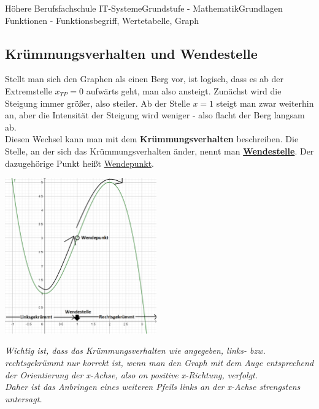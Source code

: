 \documentclass[11pt,twocolumn,oneside,openany,headings=optiontotoc,11pt,numbers=noenddot]{article}
\begin{document}
\begin{worksheet}{Höhere Berufsfachschule IT-Systeme}{Grundstufe - Mathematik}{Grundlagen Funktionen - Funktionsbegriff, Wertetabelle, Graph}
		\subsection*{Krümmungsverhalten und Wendestelle}
		Stellt man sich den Graphen als einen Berg vor, ist logisch, dass es ab der Extremstelle \(x_{TP} = 0\) aufwärts geht, man also ansteigt. Zunächst wird die Steigung immer größer, also steiler. Ab der Stelle \(x = 1\) steigt man zwar weiterhin an, aber die Intensität der Steigung wird weniger - also flacht der Berg langsam ab.\\
		Diesen Wechsel kann man mit dem \textbf{Krümmungsverhalten} beschreiben. Die Stelle, an der sich das Krümmungsverhalten änder, nennt man \textbf{\underline{Wendestelle}}. Der dazugehörige Punkt heißt \underline{Wendepunkt}.\\
		\par\bigskip\noindent
		\includegraphics[width=0.49\textwidth]{../99_Bilder/WP.png}\\
		\par\bigskip\noindent
		\textit{Wichtig ist, dass das Krümmungsverhalten wie angegeben, \glqq{}links-\grqq{} bzw. \glqq{}rechtsgekrümmt\grqq{} nur korrekt ist, wenn man den Graph mit dem Auge entsprechend der Orientierung der x-Achse, also on positive x-Richtung, verfolgt.\\ Daher ist das Anbringen eines weiteren Pfeils links an der x-Achse strengstens untersagt.}
	\end{worksheet}
\end{document}
